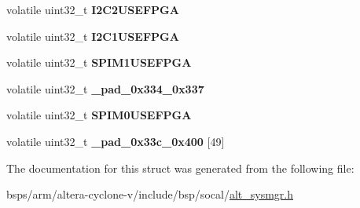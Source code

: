 \begin{DoxyCompactItemize}
\item 
\mbox{\label{structALT__SYSMGR__PINMUX__raw__s_a3d193cfe09ffd692ac2520ef7c3e754a}} 
volatile uint32\+\_\+t {\bfseries I2\+C2\+U\+S\+E\+F\+P\+GA}
\item 
\mbox{\label{structALT__SYSMGR__PINMUX__raw__s_a24c2199c529af81f85ac2c057ae48679}} 
volatile uint32\+\_\+t {\bfseries I2\+C1\+U\+S\+E\+F\+P\+GA}
\item 
\mbox{\label{structALT__SYSMGR__PINMUX__raw__s_ac6d15357972c5624fb0826bc8407a556}} 
volatile uint32\+\_\+t {\bfseries S\+P\+I\+M1\+U\+S\+E\+F\+P\+GA}
\item 
\mbox{\label{structALT__SYSMGR__PINMUX__raw__s_a1c1fbc095790ffcec60254e7ac547b86}} 
volatile uint32\+\_\+t {\bfseries \+\_\+pad\+\_\+0x334\+\_\+0x337}
\item 
\mbox{\label{structALT__SYSMGR__PINMUX__raw__s_a437e777a7106b1624a176946106a1216}} 
volatile uint32\+\_\+t {\bfseries S\+P\+I\+M0\+U\+S\+E\+F\+P\+GA}
\item 
\mbox{\label{structALT__SYSMGR__PINMUX__raw__s_a9807e5ff3b0e44b0ad7dbb3709f5bf7e}} 
volatile uint32\+\_\+t {\bfseries \+\_\+pad\+\_\+0x33c\+\_\+0x400} \mbox{[}49\mbox{]}
\end{DoxyCompactItemize}


The documentation for this struct was generated from the following file\+:\begin{DoxyCompactItemize}
\item 
bsps/arm/altera-\/cyclone-\/v/include/bsp/socal/\mbox{\hyperlink{alt__sysmgr_8h}{alt\+\_\+sysmgr.\+h}}\end{DoxyCompactItemize}
